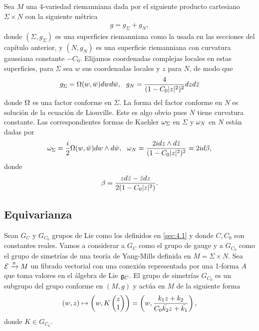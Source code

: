 Sea $M$ una 4-variedad riemanniana dada por el siguiente producto cartesiano $\Sigma\times N$ con la siguiente métrica
\begin{align}
	g=g_{\Sigma}+g_N,
\end{align}
donde $(\Sigma,g_{\Sigma})$ es una superficies riemanniana como la usada en las secciones del capítulo anterior, y $(N,g_N)$ es una superficie riemanniana con curvatura gaussiana constante $-C_0$. Elijamos coordenadas complejas locales en estas superficies, para $\Sigma$ sea $w$ sus coordenadas locales y $z$ para $N$, de modo que
\begin{align}
	g_{\Sigma}=\Omega(w,\bar w)dwd\bar w, \ \ g_N = \frac{4}{(1-C_0|z|^2)^2}dzd\bar z
\end{align} 
donde $\Omega$ es una factor conforme en $\Sigma$. La forma del factor conforme en $N$ es solución de la ecuación de Liouville. Este es algo obvio pues $N$ tiene curvatura constante. Las correspondientes formas de Kaehler $\omega_\Sigma$ en $\Sigma$ y $\omega_N$ en $N$ están dadas por
\begin{align}
	\omega_\Sigma = \frac{i}{2}\Omega(w,\bar w)dw\wedge d\bar w, \ \ \omega_N = \frac{2idz\wedge d\bar z}{(1-C_0|z|^2)^2} = 2id\beta,
\end{align}
donde 
\begin{align}
	\beta = \frac{zd\bar z-\bar zdz}{2(1-C_0|z|^2)}. \label{eq:4.2.2.4}
\end{align}

\subsection{Equivarianza}

Sean $G_C$ y $G_{C_0}$ grupos de Lie como los definidos en \ref{sec:4.1} y donde $C,C_0$ son constantes reales. Vamos a considerar a $G_C$ como el grupo de gauge y a $G_{C_0}$ como el grupo de simetrías de una teoría de Yang-Mills definida en $M=\Sigma\times N$. Sea $\mathcal{E}\xrightarrow{\pi} M$ un fibrado vectorial con una conexión representada por una 1-forma $A$ que toma valores en el álgebra de Lie $\mathfrak{g}_C$. El grupo de simetrías $G_{C_0}$ es un subgrupo del grupo conforme en $(M,g)$ y actúa en $M$ de la siguiente forma
\begin{align}
	(w,z)\mapsto \left(w,K\begin{pmatrix}
	z\\ 1
	\end{pmatrix}\right) = \left(w,\frac{k_1 z+k_2}{C_0\bar{k_2}z+\bar{k_1}}\right),
\end{align}
donde $K\in G_{C_0}$.

